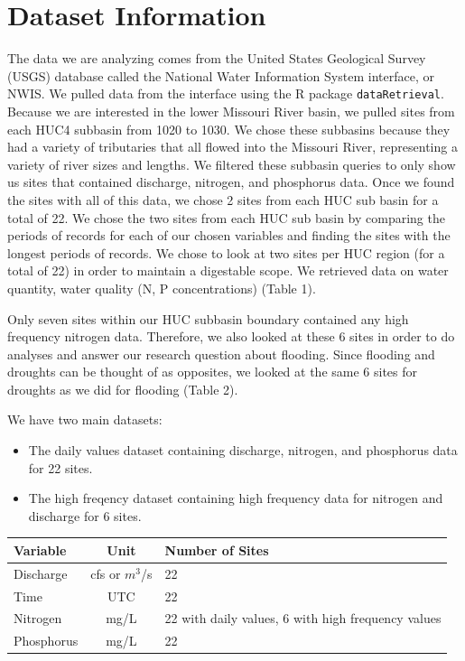 \documentclass[12pt,]{article}
\begin{document}
\newpage

\hypertarget{dataset-information}{%
\section{Dataset Information}\label{dataset-information}}

The data we are analyzing comes from the United States Geological Survey
(USGS) database called the National Water Information System interface,
or NWIS. We pulled data from the interface using the R package
\texttt{dataRetrieval}. Because we are interested in the lower Missouri
River basin, we pulled sites from each HUC4 subbasin from 1020 to 1030.
We chose these subbasins because they had a variety of tributaries that
all flowed into the Missouri River, representing a variety of river
sizes and lengths. We filtered these subbasin queries to only show us
sites that contained discharge, nitrogen, and phosphorus data. Once we
found the sites with all of this data, we chose 2 sites from each HUC
sub basin for a total of 22. We chose the two sites from each HUC sub
basin by comparing the periods of records for each of our chosen
variables and finding the sites with the longest periods of records. We
chose to look at two sites per HUC region (for a total of 22) in order
to maintain a digestable scope. We retrieved data on water quantity,
water quality (N, P concentrations) (Table 1).

Only seven sites within our HUC subbasin boundary contained any high
frequency nitrogen data. Therefore, we also looked at these 6 sites in
order to do analyses and answer our research question about flooding.
Since flooding and droughts can be thought of as opposites, we looked at
the same 6 sites for droughts as we did for flooding (Table 2).

We have two main datasets:

\begin{itemize}
\item
  The daily values dataset containing discharge, nitrogen, and
  phosphorus data for 22 sites.
\item
  The high freqency dataset containing high frequency data for nitrogen
  and discharge for 6 sites.
\end{itemize}

\begin{longtable}[]{@{}lcl@{}}
\toprule
Variable & Unit & Number of Sites\tabularnewline
\midrule
\endhead
Discharge & cfs or \(m^{3}\)/s & 22\tabularnewline
Time & UTC & 22\tabularnewline
Nitrogen & mg/L & 22 with daily values, 6 with high frequency
values\tabularnewline
Phosphorus & mg/L & 22\tabularnewline
\bottomrule
\end{longtable}
\end{document}
